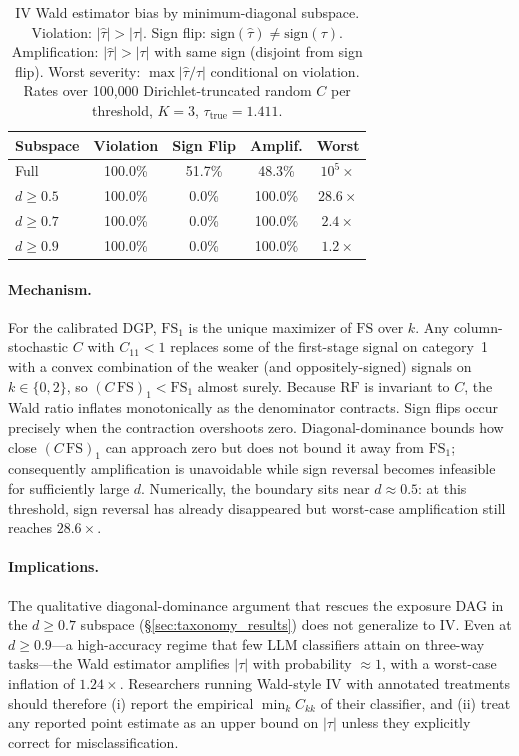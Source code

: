 \begin{table}[t]
\centering
\caption{IV Wald estimator bias by minimum-diagonal subspace.
Violation: $|\hat\tau| > |\tau|$.
Sign flip: $\mathrm{sign}(\hat\tau) \neq \mathrm{sign}(\tau)$.
Amplification: $|\hat\tau| > |\tau|$ with same sign (disjoint from sign flip).
Worst severity: $\max |\hat\tau / \tau|$ conditional on violation.
Rates over 100{,}000 Dirichlet-truncated random $C$ per threshold,
$K{=}3$, $\tau_{\text{true}}{=}1.411$.}
\label{tab:iv_dirichlet_subspace}
\small
\begin{tabular}{lcccc}
\toprule
\textbf{Subspace} & \textbf{Violation} & \textbf{Sign Flip} & \textbf{Amplif.} & \textbf{Worst} \\
\midrule
Full           & 100.0\% & 51.7\% & 48.3\% & $10^{5}\!\times$ \\
$d \geq 0.5$   & 100.0\% & 0.0\%  & 100.0\% & $28.6\times$ \\
$d \geq 0.7$   & 100.0\% & 0.0\%  & 100.0\% & $2.4\times$ \\
$d \geq 0.9$   & 100.0\% & 0.0\%  & 100.0\% & $1.2\times$ \\
\bottomrule
\end{tabular}
\end{table}

\paragraph{Mechanism.}
For the calibrated DGP, $\mathrm{FS}_1$ is the unique maximizer of
$\mathrm{FS}$ over $k$. Any column-stochastic $C$ with $C_{11}<1$ replaces
some of the first-stage signal on category~1 with a convex combination of
the weaker (and oppositely-signed) signals on $k\in\{0,2\}$, so
$(C\,\mathrm{FS})_1 < \mathrm{FS}_1$ almost surely. Because
$\mathrm{RF}$ is invariant to $C$, the Wald ratio inflates monotonically as
the denominator contracts. Sign flips occur precisely when the contraction
overshoots zero. Diagonal-dominance bounds how close $(C\,\mathrm{FS})_1$
can approach zero but does not bound it away from $\mathrm{FS}_1$;
consequently amplification is unavoidable while sign reversal becomes
infeasible for sufficiently large $d$. Numerically, the boundary sits
near $d{\approx}0.5$: at this threshold, sign reversal has already
disappeared but worst-case amplification still reaches $28.6\times$.

\paragraph{Implications.}
The qualitative diagonal-dominance argument that rescues the exposure DAG
in the $d{\geq}0.7$ subspace (\S\ref{sec:taxonomy_results}) does not
generalize to IV. Even at $d{\geq}0.9$---a high-accuracy regime that few
LLM classifiers attain on three-way tasks---the Wald estimator amplifies
$|\tau|$ with probability $\approx 1$, with a worst-case inflation of
$1.24\times$. Researchers running Wald-style IV with annotated treatments
should therefore (i) report the empirical $\min_k C_{kk}$ of their
classifier, and (ii) treat any reported point estimate as an upper bound on
$|\tau|$ unless they explicitly correct for misclassification.
